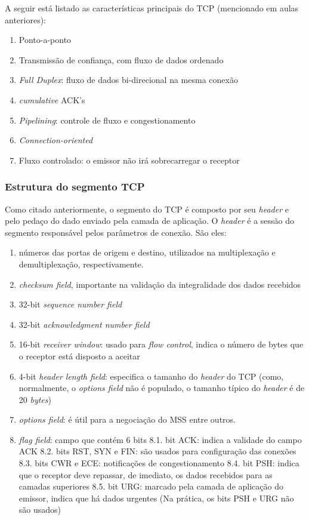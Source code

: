 A seguir está listado as características principais do TCP (mencionado
em aulas anteriores):

\begin{enumerate}
\def\labelenumi{\arabic{enumi}.}
\tightlist
\item
  Ponto-a-ponto
\item
  Transmissão de confiança, com fluxo de dados ordenado
\item
  \emph{Full Duplex}: fluxo de dados bi-direcional na mesma conexão
\item
  \emph{cumulative} ACK's
\item
  \emph{Pipelining}: controle de fluxo e congestionamento
\item
  \emph{Connection-oriented}
\item
  Fluxo controlado: o emissor não irá sobrecarregar o receptor
\end{enumerate}

\hypertarget{estrutura-do-segmento-tcp}{%
\subsubsection{Estrutura do segmento TCP}\label{estrutura-do-segmento-tcp}}

Como citado anteriormente, o segmento do TCP é composto por seu
\emph{header} e pelo pedaço do dado enviado pela camada de aplicação. O
\emph{header} é a sessão do segmento responsável pelos parâmetros de
conexão. São eles:

\begin{enumerate}
\def\labelenumi{\arabic{enumi}.}
\tightlist
\item
  números das portas de origem e destino, utilizados na multiplexação e
  demultiplexação, respectivamente.
\item
  \emph{checksum field}, importante na validação da integralidade dos
  dados recebidos
\item
  32-bit \emph{sequence number field}
\item
  32-bit \emph{acknowledgment number field}
\item
  16-bit \emph{receiver window}: usado para \emph{flow control}, indica
  o número de bytes que o receptor está disposto a aceitar
\item
  4-bit \emph{header length field}: especifica o tamanho do
  \emph{header} do TCP (como, normalmente, o \emph{options field} não é
  populado, o tamanho típico do \emph{header} é de 20 \emph{bytes})
\item
  \emph{options field}: é útil para a negociação do MSS entre outros.
\item
  \emph{flag field}: campo que contém 6 bits 8.1. bit ACK: indica a
  validade do campo ACK 8.2. bits RST, SYN e FIN: são usados para
  configuração das conexões 8.3. bits CWR e ECE: notificações de
  congestionamento 8.4. bit PSH: indica que o receptor deve repassar, de
  imediato, os dados recebidos para as camadas superiores 8.5. bit URG:
  marcado pela camada de aplicação do emissor, indica que há dados
  urgentes (Na prática, os bits PSH e URG não são usados)
\end{enumerate}


